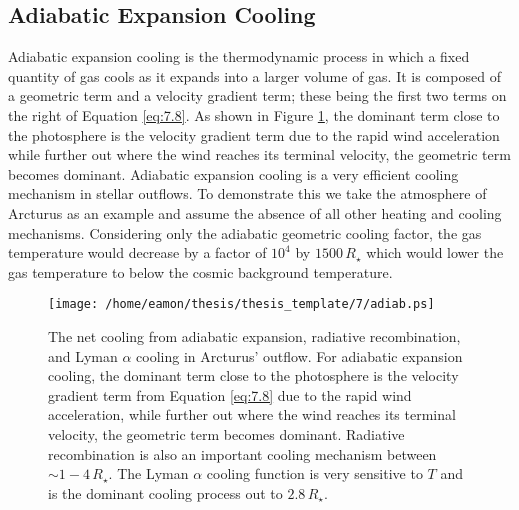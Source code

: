 \subsection{Adiabatic Expansion Cooling}\label{sec:7.3.1}
Adiabatic expansion cooling is the thermodynamic process in which a fixed quantity of gas cools as it expands into a larger volume of gas. It is composed of a geometric term and a velocity gradient term; these being the first two terms on the right of Equation \ref{eq:7.8}. As shown in Figure \ref{fig:7.1}, the dominant term close to the photosphere is the velocity gradient term due to the rapid wind acceleration while further out where the wind reaches its terminal velocity, the geometric term becomes dominant. Adiabatic expansion cooling is a very efficient cooling mechanism in stellar outflows. To demonstrate this we take the atmosphere of Arcturus as an example and assume the absence of all other heating and cooling mechanisms. Considering only the adiabatic geometric cooling factor, the gas temperature would decrease by a factor of $10^4$ by $1500\,R_{\star}$ which would lower the gas temperature to below the cosmic background temperature. 

\begin{figure}[!ht]
\centering 
         \texttt{[image: /home/eamon/thesis/thesis\_template/7/adiab.ps]}
\caption[]{The net cooling from adiabatic expansion, radiative recombination, and Lyman $\alpha$ cooling in Arcturus' outflow. For adiabatic expansion cooling, the dominant term close to the photosphere is the velocity gradient term from Equation \ref{eq:7.8} due to the rapid wind acceleration, while further out where the wind reaches its terminal velocity, the geometric term becomes dominant. Radiative recombination is also an important cooling mechanism between $\sim 1-4\,R_{\star}$. The Lyman $\alpha$ cooling function is very sensitive to $T$ and is the dominant cooling process out to $2.8\,R_{\star}$.}
\label{fig:7.1}
\end{figure}


